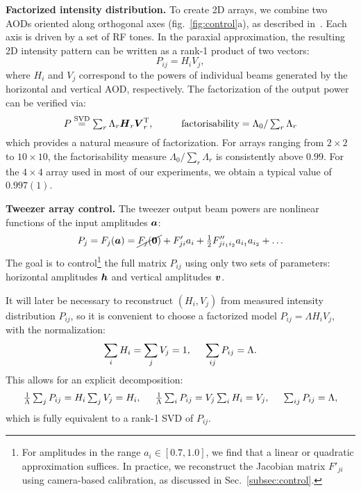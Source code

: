 \textbf{Factorized intensity distribution.} 
To create 2D arrays, we combine two AODs oriented along orthogonal axes (fig.~\ref{fig:control}a), as described in~\cite{culemann_construction_2024}.
Each axis is driven by a set of RF tones. In the paraxial approximation, the resulting 2D intensity pattern can be written as a rank-1 product of two vectors:
\begin{equation*}
    P_{ij} = H_i V_j,
\end{equation*}
where $H_i$ and $V_j$ correspond to the powers of individual beams generated by the horizontal and vertical AOD, respectively. The factorization of the output power can be verified via:
\begin{equation}
\label{eq:factorisability}
    P \overset{\mathrm{SVD}}{=} \textstyle \sum_r \Lambda_r \vc{H}_r \vc{V}_r\T,
    \hspace{10 mm} 
    \text{factorisability} = \Lambda_0 / \sum_r \Lambda_r 
\end{equation}
which provides a natural measure of factorization. For arrays ranging from $2\times2$ to $10\times10$, the factorisability measure $\Lambda_0 / \sum_r \Lambda_r$ is consistently above $0.99$. For the $4\times4$ array used in most of our experiments, we obtain a typical value of $0.997(1)$.

\textbf{Tweezer array control.} The tweezer output beam powers are nonlinear functions of the input amplitudes $\boldsymbol{a}$:
\begin{equation}
    \label{eq:taylerexp}
    P_j = F_j(\boldsymbol{a}) = \cancel{F_j(\boldsymbol{0})} + F'_{ji} a_i + \tfrac{1}{2} F''_{j i_1 i_2} a_{i_1} a_{i_2} + \ldots
\end{equation}
The goal is to control\footnote{
    For amplitudes in the range $a_i \in [0.7, 1.0]$, we find that a linear or quadratic approximation suffices. In practice, we reconstruct the Jacobian matrix $F'_{ji}$ using camera-based calibration, as discussed in Sec.~\ref{subsec:control}.
} the full matrix $P_{ij}$ using only two sets of parameters: horizontal amplitudes $\boldsymbol{h}$ and vertical amplitudes $\boldsymbol{v}$. 

It will later be necessary to reconstruct $(H_i, V_j)$ from measured intensity distribution $P_{ij}$, so it is convenient to choose a factorized model $P_{ij} = \Lambda H_i V_j$, with the normalization:
\begin{equation*}
    \sum_i H_i = \sum_j V_j = 1, \hspace{5 mm} \sum_{ij} P_{ij} = \Lambda.
\end{equation*}
This allows for an explicit decomposition:
\begin{equation}
    \textstyle
    \frac{1}{\Lambda} \sum_j P_{ij} = H_i \sum_j V_j = H_i,
    \hspace{5 mm} 
    \frac{1}{\Lambda} \sum_i P_{ij} = V_j \sum_i H_i = V_j,
    \hspace{5 mm} 
    \sum_{ij} P_{ij} = \Lambda,
    \label{uv-decomposition}
\end{equation}
which is fully equivalent to a rank-1 SVD of $P_{ij}$.


